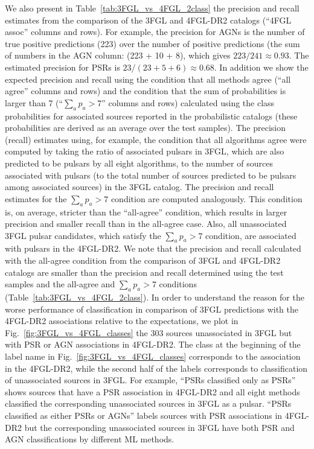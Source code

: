 \documentclass[referee]{aa} %
\begin{document}
We also present in Table~\ref{tab:3FGL_vs_4FGL_2class} the precision and recall estimates from the comparison of the 3FGL and 4FGL-DR2 catalogs (``4FGL assoc'' columns and rows).
For example, the precision for AGNs is the number of true positive predictions (223) over the number of positive predictions (the sum of numbers in the AGN column: (223 + 10 + 8), which gives $223 / 241 \approx 0.93$.
The estimated precision for PSRs is $ 23 / (23 + 5 + 6) \approx 0.68$.
In addition we show the expected precision and recall using the condition that all
methods agree (``all agree'' columns and rows) and the condition that the sum of probabilities is larger than 7 (``$\sum_a p_a > 7$'' columns and rows) calculated using the class probabilities for associated sources reported in the probabilistic catalogs (these probabilities are derived as an average over the test samples).
The precision (recall) estimates using, for example, the condition that all algorithms agree were computed by taking the ratio of associated pulsars in 3FGL, which are also predicted to be pulsars by all eight algorithms, to the number of sources associated with pulsars (to the total number of sources predicted to be pulsars among associated sources) in the 3FGL catalog.
The precision and recall estimates for the $\sum_a p_a > 7$ condition are computed analogously.
This condition is, on average, stricter than the ``all-agree'' condition, which results in larger precision and smaller recall than in the all-agree case.
Also, all unassociated 3FGL pulsar candidates, which satisfy the $\sum_a p_a > 7$ condition, are associated with pulsars in the 4FGL-DR2.
We note that the precision and recall calculated with the all-agree condition from the comparison of 3FGL and 4FGL-DR2 catalogs are smaller than the precision and recall determined using the test samples and the all-agree and $\sum_a p_a > 7$ conditions (Table~\ref{tab:3FGL_vs_4FGL_2class}).
In order to understand the reason for the worse performance of classification in comparison of 3FGL predictions with the 4FGL-DR2 associations relative to the expectations, we plot in Fig.~\ref{fig:3FGL_vs_4FGL_classes} the 303 sources unassociated in 3FGL but with PSR or AGN associations in 4FGL-DR2.
The class at the beginning of the label name in Fig.~\ref{fig:3FGL_vs_4FGL_classes} corresponds to the association in the 4FGL-DR2, while the second half of the labels corresponds to classification of unassociated sources in 3FGL. For example, ``PSRs classified only as PSRs'' shows sources that have a PSR association in 4FGL-DR2 and all eight methods classified the corresponding unassociated sources in 3FGL as a pulsar. ``PSRs classified as either PSRs or AGNs'' labels sources with PSR associations in 4FGL-DR2 but the corresponding unassociated sources in 3FGL have both PSR and AGN classifications by different ML methods.
\end{document}
